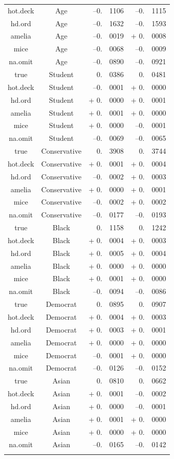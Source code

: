 \documentclass[12pt,econ]{sources/authesis}
\begin{document}
\begin{longtable}{ccr@{}lr@{}l}
 hot.deck & Age & --0.&1106 & --0.&1115 \\ 
 hd.ord & Age & --0.&1632 & --0.&1593 \\
 amelia & Age & --0.&0019 & + 0.&0008 \\ 
 mice & Age & --0.&0068 & --0.&0009 \\ 
 na.omit & Age & --0.&0890 & --0.&0921 \\ 
 true & Student & 0.&0386 & 0.&0481 \\ 
 hot.deck & Student & --0.&0001 & + 0.&0000 \\
 hd.ord & Student & + 0.&0000 & + 0.&0001 \\
 amelia & Student & + 0.&0001 & + 0.&0000 \\
 mice & Student & + 0.&0000 & --0.&0001 \\
 na.omit & Student & --0.&0069 & --0.&0065 \\ 
 true & Conservative & 0.&3908 & 0.&3744 \\ 
 hot.deck & Conservative & + 0.&0001 & + 0.&0004 \\
 hd.ord & Conservative & --0.&0002 & + 0.&0003 \\ 
 amelia & Conservative & + 0.&0000 & + 0.&0001 \\ 
 mice & Conservative & --0.&0002 & + 0.&0002 \\
 na.omit & Conservative & --0.&0177 & --0.&0193 \\
 true & Black & 0.&1158 & 0.&1242 \\ 
 hot.deck & Black & + 0.&0004 & + 0.&0003 \\ 
 hd.ord & Black & + 0.&0005 & + 0.&0004 \\ 
 amelia & Black & + 0.&0000 & + 0.&0000 \\ 
 mice & Black & + 0.&0001 & + 0.&0000 \\
 na.omit & Black & --0.&0094 & --0.&0086 \\
 true & Democrat & 0.&0895 & 0.&0907 \\ 
 hot.deck & Democrat & + 0.&0004 & + 0.&0003 \\ 
 hd.ord & Democrat & + 0.&0003 & + 0.&0001 \\ 
 amelia & Democrat & + 0.&0000 & + 0.&0000 \\
 mice & Democrat & --0.&0001 & + 0.&0000 \\
 na.omit & Democrat & --0.&0126 & --0.&0152 \\ 
 true & Asian & 0.&0810 & 0.&0662 \\
 hot.deck & Asian & + 0.&0001 & --0.&0002 \\ 
 hd.ord & Asian & + 0.&0000 & --0.&0001 \\
 amelia & Asian & + 0.&0001 & + 0.&0000 \\
 mice & Asian & + 0.&0000 & + 0.&0000 \\ 
 na.omit & Asian & --0.&0165 & --0.&0142 \\ 
 \hline \\[-1.8ex]
 \end{longtable}
\dsp
\end{document}
